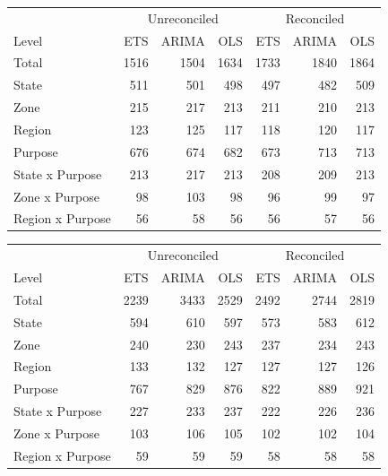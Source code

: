 \documentclass[11pt,a4paper,]{article}
\let\origtable\table
\let\endorigtable\endtable
\renewenvironment{table}[1][2] {
    \expandafter\origtable\expandafter[!htbp]
} {
    \endorigtable
}
\begin{document}
\begin{table}[!h]

\caption{\label{tab:Tourismdataresulrolling}Mean(RMSE) on 24 months test set for ETS, ARIMA and OLS with and without reconciliation - Rolling origin.}
\centering
\begin{tabular}[t]{lrrrrrr}
\toprule
\multicolumn{1}{c}{} & \multicolumn{3}{c}{Unreconciled} & \multicolumn{3}{c}{Reconciled} \\
\cmidrule(l{3pt}r{3pt}){2-4} \cmidrule(l{3pt}r{3pt}){5-7}
Level & ETS & ARIMA & OLS & ETS & ARIMA & OLS\\
\midrule
Total & 1516 & 1504 & 1634 & 1733 & 1840 & 1864\\
State & 511 & 501 & 498 & 497 & 482 & 509\\
Zone & 215 & 217 & 213 & 211 & 210 & 213\\
Region & 123 & 125 & 117 & 118 & 120 & 117\\
Purpose & 676 & 674 & 682 & 673 & 713 & 713\\
State x Purpose & 213 & 217 & 213 & 208 & 209 & 213\\
Zone x Purpose & 98 & 103 & 98 & 96 & 99 & 97\\
Region x Purpose & 56 & 58 & 56 & 56 & 57 & 56\\
\bottomrule
\end{tabular}
\end{table}

\begin{table}

\caption{\label{tab:TourismdataresultRMSE}Mean(RMSE) on 24 months test set for ETS, ARIMA and OLS with and without reconciliation - Fixed origin.}
\centering
\begin{tabular}[t]{lrrrrrr}
\toprule
\multicolumn{1}{c}{} & \multicolumn{3}{c}{Unreconciled} & \multicolumn{3}{c}{Reconciled} \\
\cmidrule(l{3pt}r{3pt}){2-4} \cmidrule(l{3pt}r{3pt}){5-7}
Level & ETS & ARIMA & OLS & ETS & ARIMA & OLS\\
\midrule
Total & 2239 & 3433 & 2529 & 2492 & 2744 & 2819\\
State & 594 & 610 & 597 & 573 & 583 & 612\\
Zone & 240 & 230 & 243 & 237 & 234 & 243\\
Region & 133 & 132 & 127 & 127 & 127 & 126\\
Purpose & 767 & 829 & 876 & 822 & 889 & 921\\
State x Purpose & 227 & 233 & 237 & 222 & 226 & 236\\
Zone x Purpose & 103 & 106 & 105 & 102 & 102 & 104\\
Region x Purpose & 59 & 59 & 59 & 58 & 58 & 58\\
\bottomrule
\end{tabular}
\end{table}
\end{document}
